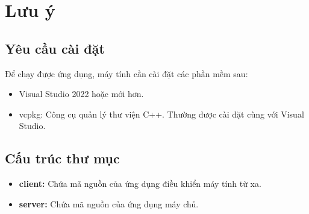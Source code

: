 \section{Lưu ý}
\subsection{Yêu cầu cài đặt}

Để chạy được ứng dụng, máy tính cần cài đặt các phần mềm sau:
\begin{itemize}
    \item Visual Studio 2022 hoặc mới hơn.
    \item vcpkg: Công cụ quản lý thư viện C++. Thường được cài đặt cùng với Visual Studio.
\end{itemize}

\subsection{Cấu trúc thư mục}
\begin{itemize}
    \item \textbf{client:} Chứa mã nguồn của ứng dụng điều khiển máy tính từ xa.
    \item \textbf{server:} Chứa mã nguồn của ứng dụng máy chủ.
\end{itemize}